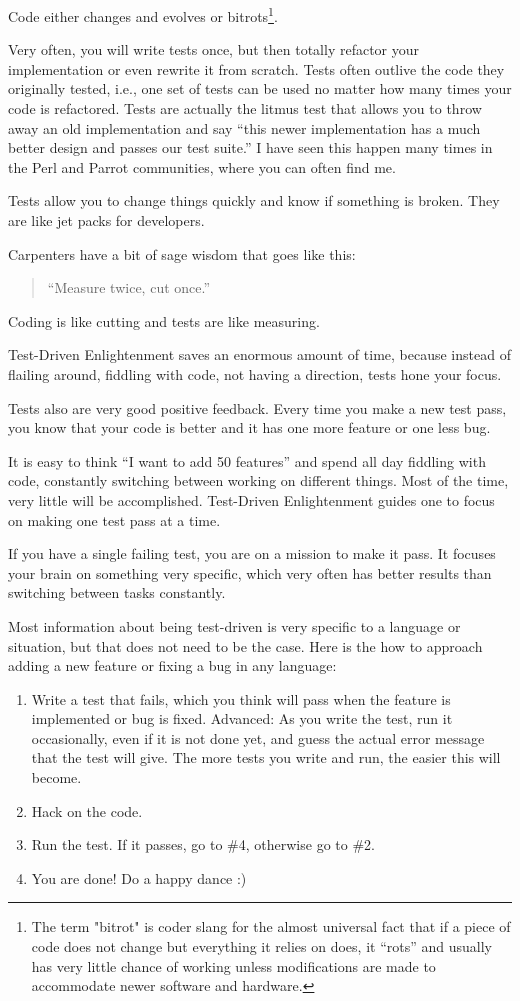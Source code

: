 Code either changes and evolves or bitrots\footnote{The term "bitrot" is coder
slang for the almost universal fact that if a piece of code does not change but
everything it relies on does, it ``rots'' and usually has very little chance of
working unless modifications are made to accommodate newer software and
hardware.}.

Very often, you will write tests once, but then totally refactor your
implementation or even rewrite it from scratch. Tests often outlive the code
they originally tested, i.e., one set of tests can be used no matter how many
times your code is refactored. Tests are actually the litmus test that allows you to throw away an old implementation and say ``this newer implementation has a much better design and passes our test suite.'' I have seen this happen many
times in the Perl and Parrot communities, where you can often find me.

Tests allow you to change things quickly and know if something is broken. They
are like jet packs for developers.

Carpenters have a bit of sage wisdom that goes like this:
\begin{quote}``Measure twice, cut once.''\end{quote} 

Coding is like cutting and tests are like measuring.

Test-Driven Enlightenment saves an enormous amount of time, because instead of
flailing around, fiddling with code, not having a direction, tests hone your
focus.

Tests also are very good positive feedback. Every time you make a new test pass,
you know that your code is better and it has one more feature or one less bug.

It is easy to think ``I want to add 50 features'' and spend all day fiddling
with code, constantly switching between working on different things. Most of the
time, very little will be accomplished. Test-Driven Enlightenment guides one to
focus on making one test pass at a time.

If you have a single failing test, you are on a mission to make it pass. It focuses
your brain on something very specific, which very often has better results than
switching between tasks constantly.

Most information about being test-driven is very specific to a language or
situation, but that does not need to be the case. Here is the how to approach
adding a new feature or fixing a bug in any language:
\begin{enumerate}
 \item Write a test that fails, which you think will pass when the feature is
implemented or bug is fixed. Advanced: As you write the test, run it
occasionally, even if it is not done yet, and guess the actual error message
that the test will give. The more tests you write and run, the easier this will
become.
 \item Hack on the code.
 \item Run the test. If it passes, go to \#4, otherwise go to \#2.
 \item You are done! Do a happy dance :)
\end{enumerate}

